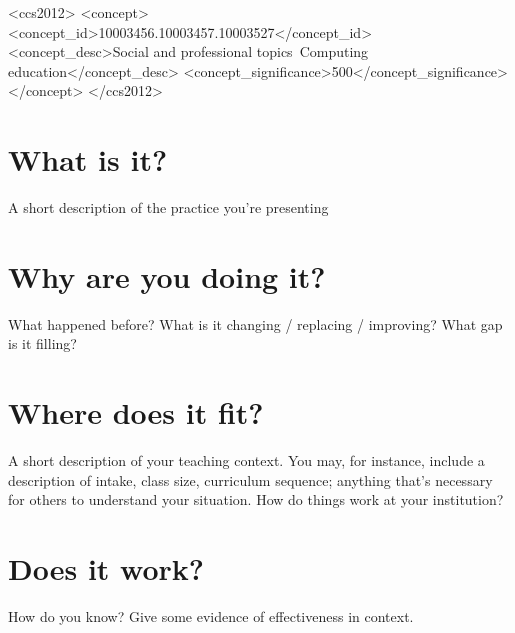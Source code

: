 \documentclass[sigconf]{acmart}
\begin{document}
\begin{CCSXML}
<ccs2012>
<concept>
<concept_id>10003456.10003457.10003527</concept_id>
<concept_desc>Social and professional topics~Computing education</concept_desc>
<concept_significance>500</concept_significance>
</concept>
</ccs2012>
\end{CCSXML}




\maketitle


\section{What is it?}	
A short description of the practice you're presenting
\section{Why are you doing it?}
What happened before? What is it changing / replacing / improving? What gap is it filling?
\section{Where does it fit?}
A short description of your teaching context. You may, for instance, include a description of intake, class size, curriculum sequence; anything that's necessary for others to understand your situation. How do things work at your institution?
\section{Does it work?}	
How do you know? Give some evidence of effectiveness in context.
\end{document}
